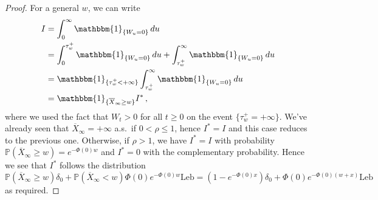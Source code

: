 \documentclass[titlepage]{article}
\theoremstyle{plain}
\theoremstyle{definition}
\DeclareRobustCommand{\probX}[2][{\mathbb{P}}]{\ensuremath{ {#1}\left( {#2} \right)}}
\begin{document}
\begin{proof}
  For a general $w$, we can write
  \begin{align}
    I & = \int_0^\infty \mathbbm{1}_{\{ W_u = 0 \}} \, du                                                                \\
      & = \int_0^{\tau^+_w} \mathbbm{1}_{\{ W_u = 0 \}} \, du + \int_{\tau^+_w}^\infty \mathbbm{1}_{\{ W_u = 0 \}} \, du \\
      & = \mathbbm{1}_{\{ \tau^+_w < +\infty \}} \int_{\tau^+_w}^\infty \mathbbm{1}_{\{ W_u = 0 \}} \, du                 \\
      & = \mathbbm{1}_{\{ \overline{X}_\infty \geq w \}} I^* \,,
  \end{align}
  where we used the fact that $W_t > 0$ for all $t \geq 0$ on the event $\{ \tau_w^+ = +\infty \}$. We've already seen that $\overline{X}_\infty = +\infty$ a.s.\ if $0 < \rho \leq 1$, hence $I^* = I$ and this case reduces to the previous one. Otherwise, if $\rho > 1$, we have $I^* = I$ with probability $\probX{\overline{X}_\infty \geq w} = e^{-\Phi(0) w}$ and $I^* = 0$ with the complementary probability. Hence we see that $I^*$ follows the distribution
  \begin{equation}
    \probX{\overline{X}_\infty \geq w} \delta_0 + \probX{\overline{X}_\infty < w} \Phi(0) e^{-\Phi(0) w} \mathrm{Leb} = (1 - e^{-\Phi(0) x}) \delta_0 + \Phi(0) e^{-\Phi(0)(w + x)} \mathrm{Leb} \,
  \end{equation}
  as required.
\end{proof}

\clearpage

\printbibliography
\end{document}
